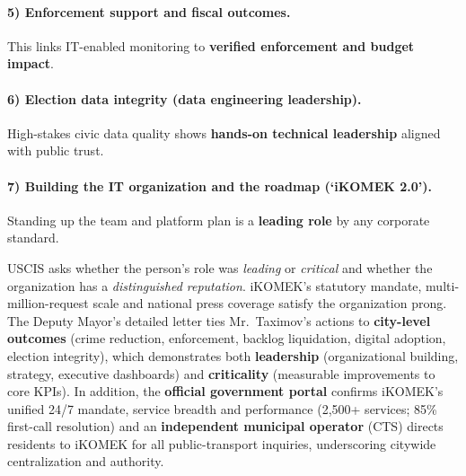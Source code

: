 \paragraph{5) Enforcement support and fiscal outcomes.}
This links IT-enabled monitoring to \textbf{verified enforcement and budget impact}.

\paragraph{6) Election data integrity (data engineering leadership).}
High-stakes civic data quality shows \textbf{hands-on technical leadership} aligned with public trust.

\paragraph{7) Building the IT organization and the roadmap (‘iKOMEK 2.0’).}
Standing up the team and platform plan is a \textbf{leading role} by any corporate standard.

USCIS asks whether the person’s role was \emph{leading} or \emph{critical} and whether the organization has a \emph{distinguished reputation}. iKOMEK’s statutory mandate, multi-million-request scale and national press coverage satisfy the organization prong. The Deputy Mayor’s detailed letter ties Mr.\ Taximov’s actions to \textbf{city-level outcomes} (crime reduction, enforcement, backlog liquidation, digital adoption, election integrity), which demonstrates both \textbf{leadership} (organizational building, strategy, executive dashboards) and \textbf{criticality} (measurable improvements to core KPIs). In addition, the \textbf{official government portal} confirms iKOMEK’s unified 24/7 mandate, service breadth and performance (2{,}500+ services; 85\% first-call resolution) and an \textbf{independent municipal operator} (CTS) directs residents to iKOMEK for all public-transport inquiries, underscoring citywide centralization and authority. 

